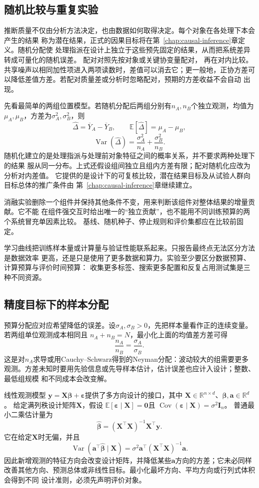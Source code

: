 \subsection{随机比较与重复实验}
推断质量不仅由分析方法决定，也由数据如何取得决定。每个对象在各处理下本会产生的结果
称为潜在结果，正式的因果目标将在第~\ref{chap:causal-inference}章定义。随机分配使
处理指派在设计上独立于这些预先固定的结果，从而把系统差异转成可量化的随机误差。
配对对照先按对象或关键协变量配对，
再在对内比较。共享噪声以相同加性项进入两项读数时，差值可以消去它；更一般地，正协方差可以降低差值方差。若配对质量差或分析时忽略配对，预期的方差收益不会自动
出现。

先看最简单的两组位置模型。若随机分配后两组分别有\(n_A,n_B\)个独立观测，均值为
\(\mu_A,\mu_B\)，方差为\(\sigma_A^2,\sigma_B^2\)，则
\[
  \widehat\Delta=\overline Y_A-\overline Y_B,\qquad
  \mathbb{E}[\widehat\Delta]=\mu_A-\mu_B,
\]
\[
  \operatorname{Var}(\widehat\Delta)
  =\frac{\sigma_A^2}{n_A}+\frac{\sigma_B^2}{n_B}.
\]
随机化建立的是处理指派与处理前对象特征之间的概率关系，并不要求两种处理下的结果
服从同一分布。上式还假设组间独立且组内方差有限；配对随机化应改为分析对内差值。
它提供的是设计下的可复核比较，潜在结果目标及从试验人群向目标总体的推广条件由
第~\ref{chap:causal-inference}章继续建立。

消融实验删除一个组件并保持其他条件不变，用来判断该组件对整体结果的增量贡献。它不能
在组件强交互时给出唯一的“独立贡献”，也不能用不同训练预算的两个系统冒充单因素比较。
基线、随机种子、停止规则和评价集都应在比较前固定。

学习曲线把训练样本量或计算量与验证性能联系起来。只报告最终点无法区分方法是数据效率
更高，还是只是使用了更多数据和算力。实验至少要区分数据预算、计算预算与评价时间预算：
收集更多标签、搜索更多配置和反复占用测试集是三种不同资源。

\subsection{精度目标下的样本分配}
预算分配应对应希望降低的误差。设\(\sigma_A,\sigma_B>0\)，先把样本量看作正的连续变量。若两组单位观测成本相同且
\(n_A+n_B=N\)，最小化上面的均值差方差可得
\[
  \frac{n_A}{n_B}=\frac{\sigma_A}{\sigma_B}.
\]
这是对\(n_A\)求导或用Cauchy--Schwarz得到的Neyman分配：波动较大的组需要更多
观测。方差未知时要用先验信息或先导样本估计，估计误差也应计入设计；整数、最低组规模
和不同成本会改变解。

线性观测模型
\(\bm y=\bm X\bm\beta+\bm\varepsilon\)提供了多方向设计的接口，其中
\(\bm X\in\mathbb{R}^{n\times d}\)、\(\bm\beta,\bm a\in\mathbb{R}^d\)。
给定满列秩设计矩阵\(\bm X\)，假设
\(\mathbb{E}[\bm\varepsilon\mid\bm X]=\bm{0}\)且
\(\operatorname{Cov}(\bm\varepsilon\mid\bm X)=\sigma^2\bm I_n\)。
普通最小二乘估计量为
\[
  \widehat{\bm\beta}
  =(\bm X^\top\bm X)^{-1}\bm X^\top\bm y.
\]
它在给定\(\bm X\)时无偏，并且
\[
  \operatorname{Var}(\bm a^\top\widehat{\bm\beta}\mid\bm X)
  =\sigma^2\bm a^\top(\bm X^\top\bm X)^{-1}\bm a.
\]
因此新增观测的特征方向会改变设计矩阵，并降低某些\(\bm a\)方向的方差；它未必同样
改善其他方向、预测总体或非线性目标。最小化最坏方向、平均方向或行列式体积会得到不同
设计准则，必须先声明评价对象。

